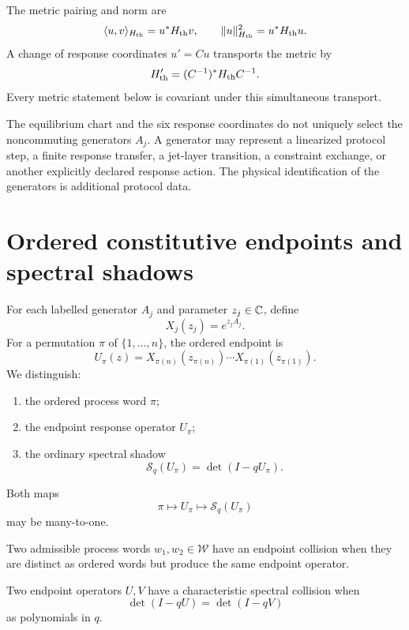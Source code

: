 The metric pairing and norm are
\[
 \langle u,v\rangle_{H_{\mathrm{th}}}=u^*H_{\mathrm{th}} v,
 \qquad
 \|u\|_{H_{\mathrm{th}}}^2=u^*H_{\mathrm{th}} u.
\]
A change of response coordinates $u'=Cu$ transports the metric by
\[
 H_{\mathrm{th}}'=(C^{-1})^*H_{\mathrm{th}} C^{-1}.
\]
Every metric statement below is covariant under this simultaneous transport.

\begin{remark}
The equilibrium chart and the six response coordinates do not uniquely select the noncommuting generators $A_j$. A generator may represent a linearized protocol step, a finite response transfer, a jet-layer transition, a constraint exchange, or another explicitly declared response action. The physical identification of the generators is additional protocol data.
\end{remark}

\section{Ordered constitutive endpoints and spectral shadows}

For each labelled generator $A_j$ and parameter $z_j\in\mathbb C$, define
\[
 X_j(z_j)=e^{z_jA_j}.
\]
For a permutation $\pi$ of $\{1,\ldots,n\}$, the ordered endpoint is
\[
 U_\pi(z)=X_{\pi(n)}(z_{\pi(n)})\cdots X_{\pi(1)}(z_{\pi(1)}).
\]
We distinguish:
\begin{enumerate}[label=(\roman*)]
\item the ordered process word $\pi$;
\item the endpoint response operator $U_\pi$;
\item the ordinary spectral shadow
\[
 \mathcal S_q(U_\pi)=\det(I-qU_\pi).
\]
\end{enumerate}
Both maps
\[
 \pi\longmapsto U_\pi\longmapsto \mathcal S_q(U_\pi)
\]
may be many-to-one.

\begin{definition}
Two admissible process words $w_1,w_2\in\mathcal W$ have an endpoint collision when they are distinct as ordered words but produce the same endpoint operator.
\end{definition}

\begin{definition}
Two endpoint operators $U,V$ have a characteristic spectral collision when
\[
 \det(I-qU)=\det(I-qV)
\]
as polynomials in $q$.
\end{definition}

